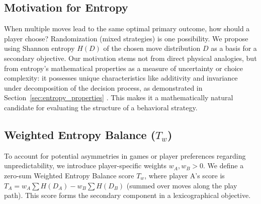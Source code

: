 \documentclass{article}
\begin{document}
\subsection{Motivation for Entropy}
When multiple moves lead to the same optimal primary outcome, how should a player choose? Randomization (mixed strategies) is one possibility. We propose using Shannon entropy $H(D)$ of the chosen move distribution $D$ as a basis for a secondary objective. Our motivation stems not from direct physical analogies, but from entropy's mathematical properties as a measure of uncertainty or choice complexity: it possesses unique characteristics like additivity and invariance under decomposition of the decision process, as demonstrated in Section~\ref{sec:entropy_properties} \cite{placeholder_shannon_properties}. This makes it a mathematically natural candidate for evaluating the structure of a behavioral strategy.

\subsection{Weighted Entropy Balance (\texorpdfstring{$T_w$}{Tw})}
To account for potential asymmetries in games or player preferences regarding unpredictability, we introduce player-specific weights $w_A, w_B > 0$. We define a zero-sum Weighted Entropy Balance score $T_w$, where player A's score is $T_A = w_A \sum H(D_A) - w_B \sum H(D_B)$ (summed over moves along the play path). This score forms the secondary component in a lexicographical objective.
\end{document}
